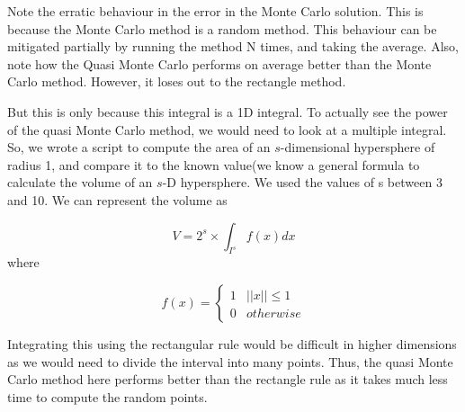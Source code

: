 \documentclass[12pt,letterpaper, twoside]{article}
\theoremstyle{definition}
\begin{document}
Note the erratic behaviour in the error in the Monte Carlo solution. This is because the Monte Carlo method is a random method. This behaviour can be mitigated partially by running the method N times, and taking the average. Also, note how the Quasi Monte Carlo performs on average better than the Monte Carlo method. However, it loses out to the rectangle method.

But this is only because this integral is a 1D integral. To actually see the power of the quasi Monte Carlo method, we would need to look at a multiple integral. So, we wrote a script to compute the area of an $s$-dimensional hypersphere of radius 1, and compare it to the known value(we know a general formula to calculate the volume of an $s$-D hypersphere. We used the values of s between 3 and 10. We can represent the volume as 

$$V = 2^s \times \int_{I^s}f(x)dx$$ where 

$$
f(x) =  \begin{cases} 
    1 & ||x|| \leq 1 \\
    0 & otherwise
    \end{cases}
$$

Integrating this using the rectangular rule would be difficult in higher dimensions as we would need to divide the interval into many points. Thus, the quasi Monte Carlo method here performs better than the rectangle rule as it takes much less time to compute the random points. 
\medskip




\end{document}
